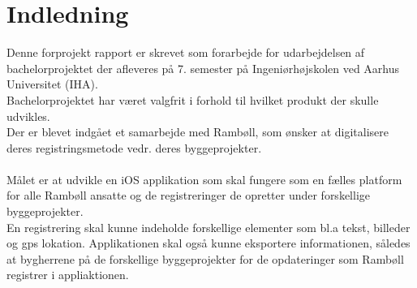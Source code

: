 \chapter{Indledning}
Denne forprojekt rapport er skrevet som forarbejde for udarbejdelsen af bachelorprojektet der afleveres på 7. semester på Ingeniørhøjskolen ved Aarhus Universitet (IHA).\\
Bachelorprojektet har været valgfrit i forhold til hvilket produkt der skulle udvikles.\\
Der er blevet indgået et samarbejde med Rambøll, som ønsker at digitalisere deres registringsmetode vedr. deres byggeprojekter.\\ \\
Målet er at udvikle en iOS applikation som skal fungere som en fælles platform for alle Rambøll ansatte og de registreringer de opretter under forskellige byggeprojekter.\\
En registrering skal kunne indeholde forskellige elementer som bl.a tekst, billeder og gps lokation. \newline
Applikationen skal også kunne eksportere informationen, således at bygherrene på de forskellige byggeprojekter for de opdateringer som Rambøll registrer i appliaktionen.